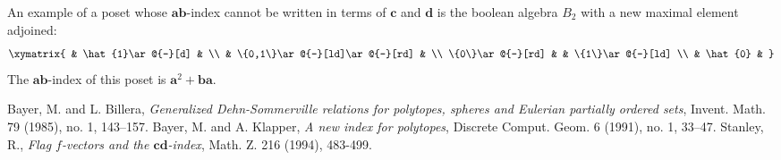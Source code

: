 \documentclass[12pt]{article}
\newcommand{\aaa}{\mathbf{a}}
\newcommand{\bbb}{\mathbf{b}}
\newcommand{\ccc}{\mathbf{c}}
\newcommand{\ddd}{\mathbf{d}}
\begin{document}
An example of a poset whose $\aaa\bbb$-index cannot be written 
in terms of $\ccc$ and $\ddd$ is the boolean algebra $B_2$ with 
a new maximal element adjoined:
\[\xymatrix{
& \hat{1}\ar@{-}[d] & \\
& \{0,1\}\ar@{-}[ld]\ar@{-}[rd] & \\
\{0\}\ar@{-}[rd] & & \{1\}\ar@{-}[ld] \\
& \hat{0} &
}\]
The $\aaa\bbb$-index of this poset is $\aaa^2+\bbb\aaa$.

\begin{thebibliography}{3}
Bayer, M. and L. Billera, \emph{Generalized Dehn-Sommerville relations for
polytopes, spheres and Eulerian partially ordered sets}, Invent. Math. 79
(1985), no. 1, 143--157.
Bayer, M. and A. Klapper, \emph{A new index for polytopes}, Discrete Comput.
Geom. 6
(1991), no. 1, 33--47.
Stanley, R., \emph{Flag $f$-vectors and the $\mathbf{cd}$-index}, Math. Z. 216 (1994), 483-499.
\end{thebibliography}
\end{document}
